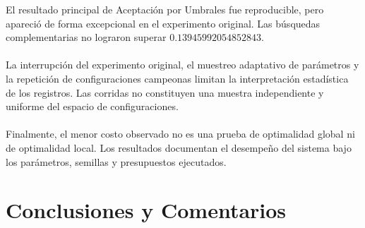 \documentclass[12pt]{article}
\begin{document}
El resultado principal de Aceptación por Umbrales fue reproducible,
pero apareció de forma excepcional en el experimento original.
Las búsquedas complementarias no lograron superar
$0.13945992054852843$.
\\\\
La interrupción del experimento original, el muestreo adaptativo
de parámetros y la repetición de configuraciones campeonas limitan
la interpretación estadística de los registros. Las corridas no
constituyen una muestra independiente y uniforme del espacio
de configuraciones.
\\\\
Finalmente, el menor costo observado no es una prueba de
optimalidad global ni de optimalidad local. Los resultados
documentan el desempeño del sistema bajo los parámetros,
semillas y presupuestos ejecutados.

\section{Conclusiones y Comentarios}
\end{document}
